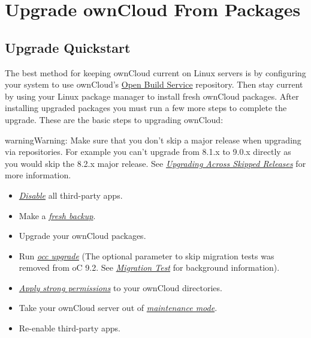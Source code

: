 \documentclass[letterpaper,10pt,english]{sphinxmanual}
\begin{document}
\section{Upgrade ownCloud From Packages}
\label{maintenance/package_upgrade:upgrade-owncloud-from-packages}\label{maintenance/package_upgrade::doc}

\subsection{Upgrade Quickstart}
\label{maintenance/package_upgrade:upgrade-quickstart}
The best method for keeping ownCloud current on Linux servers is by configuring
your system to use ownCloud's \href{https://download.owncloud.org/download/repositories/stable/owncloud/}{Open Build Service} repository. Then stay
current by using your Linux package manager to install fresh ownCloud packages.
After installing upgraded packages you must run a few more steps to complete
the upgrade. These are the basic steps to upgrading ownCloud:

\begin{notice}{warning}{Warning:}
Make sure that you don't skip a major release when upgrading via repositories.
For example you can't upgrade from 8.1.x to 9.0.x directly as you would skip the 8.2.x
major release. See {\hyperref[maintenance/package_upgrade:skipped-release-upgrade-label]{\emph{Upgrading Across Skipped Releases}}} for more information.
\end{notice}
\begin{itemize}
\item {} 
{\hyperref[installation/apps_management_installation::doc]{\emph{Disable}}} all third-party apps.

\item {} 
Make a {\hyperref[maintenance/backup::doc]{\emph{fresh backup}}}.

\item {} 
Upgrade your ownCloud packages.

\item {} 
Run {\hyperref[configuration_server/occ_command:command-line-upgrade-label]{\emph{occ upgrade}}} (The optional parameter to skip migration
tests was removed from oC 9.2. See {\hyperref[maintenance/upgrade:migration-test-label]{\emph{Migration Test}}} for background information).

\item {} 
{\hyperref[installation/installation_wizard:strong-perms-label]{\emph{Apply strong permissions}}} to your ownCloud directories.

\item {} 
Take your ownCloud server out of {\hyperref[configuration_server/occ_command:maintenance-commands-label]{\emph{maintenance mode}}}.

\item {} 
Re-enable third-party apps.

\end{itemize}
\end{document}
